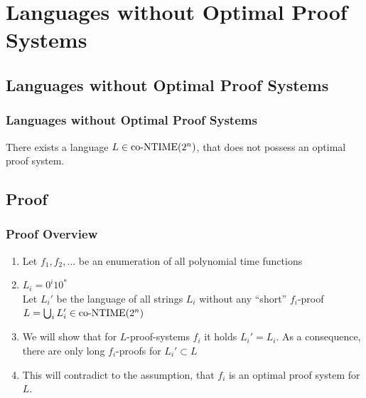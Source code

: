 \section{Languages without Optimal Proof Systems} 
\subsection{Languages without Optimal Proof Systems}

\begin{frame}
  \frametitle{Languages without Optimal Proof Systems}
  
  \begin{theorem}
    There exists a language \(L \in \text{co-NTIME}(2^n)\), that does not possess an optimal proof system.
  \end{theorem}
\end{frame}

\subsection{Proof}

\begin{frame}
  \frametitle{Proof Overview}

  \begin{enumerate}
   \item<1-> Let \(f_1, f_2, ...\) be an enumeration of all polynomial time functions
   \item<2-> \(L_i = 0^i10^*\) \\
               Let \(L_i'\) be the language of all strings \(L_i\) without any ``short'' \(f_i\)-proof \\
               \(L = \bigcup_i L_i' \in \text{co-NTIME}(2^n)\)
   \item<5-> We will show that for \(L\)-proof-systems \(f_i\) it holds \(L_i' = L_i\). As a consequence, there are only long \(f_i\)-proofs for \(L_i' \subset L\)
   \item<6-> This will contradict to the assumption, that \(f_i\) is an optimal proof system for \(L\).
  \end{enumerate}
\end{frame}

